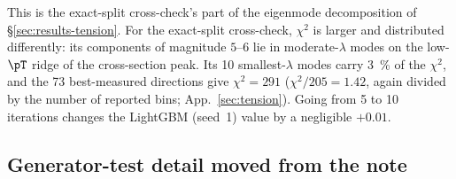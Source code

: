 This is the exact-split cross-check's part of the eigenmode decomposition of \S\ref{sec:results-tension}. For the exact-split cross-check, $\chi^{2}$ is larger and distributed differently: its components of magnitude $5$--$6$ lie in moderate-$\lambda$ modes on the low-$\pT$ ridge of the cross-section peak. Its 10 smallest-$\lambda$ modes carry \SI{3}{\percent} of the $\chi^{2}$, and the 73 best-measured directions give $\chi^{2}=291$ ($\chi^{2}/205=1.42$, again divided by the number of reported bins; App.~\ref{sec:tension}). Going from 5 to 10 iterations changes the LightGBM (seed~1) value by a negligible $+0.01$.


\subsection{Generator-test detail moved from the note}

